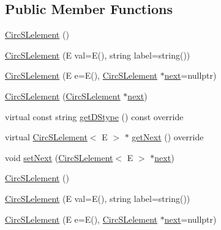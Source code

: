 \subsection*{Public Member Functions}
\begin{DoxyCompactItemize}
\item 
\mbox{\hyperlink{classbridges_1_1_circ_s_lelement_a86183d3487b906550d8f32bda3a68f98}{Circ\+S\+Lelement}} ()
\item 
\mbox{\hyperlink{classbridges_1_1_circ_s_lelement_a765032df6cfaa7cf7589c9e0df29bae4}{Circ\+S\+Lelement}} (E val=E(), string label=string())
\item 
\mbox{\hyperlink{classbridges_1_1_circ_s_lelement_a0dd7605959b4b52de041e9bcbe5abce7}{Circ\+S\+Lelement}} (E e=E(), \mbox{\hyperlink{classbridges_1_1_circ_s_lelement}{Circ\+S\+Lelement}} $\ast$\mbox{\hyperlink{classbridges_1_1_s_lelement_ad7449d10a09ebc52653a7baed812aa43}{next}}=nullptr)
\item 
\mbox{\hyperlink{classbridges_1_1_circ_s_lelement_a1fda146fc0da1d8c7d6440cbbbb2ce42}{Circ\+S\+Lelement}} (\mbox{\hyperlink{classbridges_1_1_circ_s_lelement}{Circ\+S\+Lelement}} $\ast$\mbox{\hyperlink{classbridges_1_1_s_lelement_ad7449d10a09ebc52653a7baed812aa43}{next}})
\item 
virtual const string \mbox{\hyperlink{classbridges_1_1_circ_s_lelement_a4b27c205af46162371e3ffe05cbbe3d5}{get\+D\+Stype}} () const override
\item 
virtual \mbox{\hyperlink{classbridges_1_1_circ_s_lelement}{Circ\+S\+Lelement}}$<$ E $>$ $\ast$ \mbox{\hyperlink{classbridges_1_1_circ_s_lelement_aab863627c125c6f1075af7e7b7f340cf}{get\+Next}} () override
\item 
void \mbox{\hyperlink{classbridges_1_1_circ_s_lelement_a7b2512dd1cc559f0a89d9ab4aafed172}{set\+Next}} (\mbox{\hyperlink{classbridges_1_1_circ_s_lelement}{Circ\+S\+Lelement}}$<$ E $>$ $\ast$\mbox{\hyperlink{classbridges_1_1_s_lelement_ad7449d10a09ebc52653a7baed812aa43}{next}})
\item 
\mbox{\hyperlink{classbridges_1_1_circ_s_lelement_a86183d3487b906550d8f32bda3a68f98}{Circ\+S\+Lelement}} ()
\item 
\mbox{\hyperlink{classbridges_1_1_circ_s_lelement_a765032df6cfaa7cf7589c9e0df29bae4}{Circ\+S\+Lelement}} (E val=E(), string label=string())
\item 
\mbox{\hyperlink{classbridges_1_1_circ_s_lelement_a0dd7605959b4b52de041e9bcbe5abce7}{Circ\+S\+Lelement}} (E e=E(), \mbox{\hyperlink{classbridges_1_1_circ_s_lelement}{Circ\+S\+Lelement}} $\ast$\mbox{\hyperlink{classbridges_1_1_s_lelement_ad7449d10a09ebc52653a7baed812aa43}{next}}=nullptr)

\end{DoxyCompactItemize}
